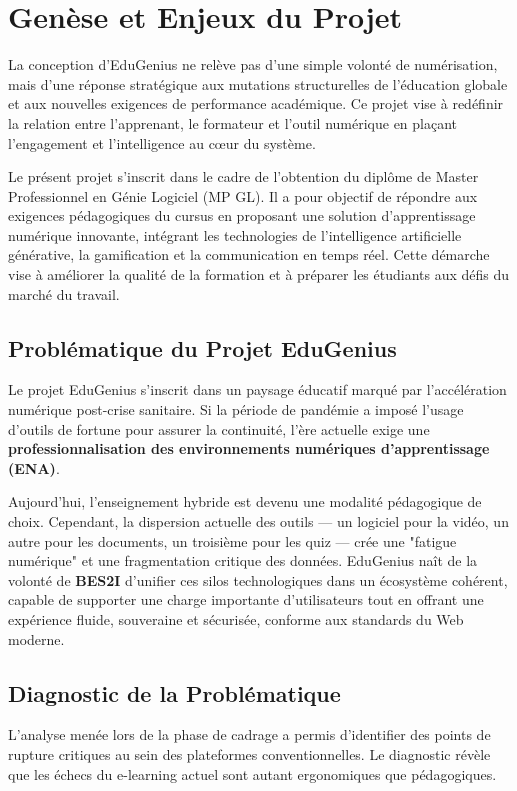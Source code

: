 \section{Genèse et Enjeux du Projet}

La conception d'EduGenius ne relève pas d'une simple volonté de numérisation, mais d'une réponse stratégique aux mutations structurelles de l'éducation globale et aux nouvelles exigences de performance académique. Ce projet vise à redéfinir la relation entre l'apprenant, le formateur et l'outil numérique en plaçant l'engagement et l'intelligence au cœur du système.

Le présent projet s'inscrit dans le cadre de l'obtention du diplôme de Master Professionnel en Génie Logiciel (MP GL). Il a pour objectif de répondre aux exigences pédagogiques du cursus en proposant une solution d'apprentissage numérique innovante, intégrant les technologies de l'intelligence artificielle générative, la gamification et la communication en temps réel. Cette démarche vise à améliorer la qualité de la formation et à préparer les étudiants aux défis du marché du travail.

\subsection{Problématique du Projet EduGenius}
Le projet EduGenius s'inscrit dans un paysage éducatif marqué par l'accélération numérique post-crise sanitaire. Si la période de pandémie a imposé l'usage d'outils de fortune pour assurer la continuité, l'ère actuelle exige une \textbf{professionnalisation des environnements numériques d'apprentissage (ENA)}.

Aujourd'hui, l'enseignement hybride est devenu une modalité pédagogique de choix. Cependant, la dispersion actuelle des outils — un logiciel pour la vidéo, un autre pour les documents, un troisième pour les quiz — crée une "fatigue numérique" et une fragmentation critique des données. EduGenius naît de la volonté de \textbf{BES2I} d'unifier ces silos technologiques dans un écosystème cohérent, capable de supporter une charge importante d'utilisateurs tout en offrant une expérience fluide, souveraine et sécurisée, conforme aux standards du Web moderne.

\subsection{Diagnostic de la Problématique}
L'analyse menée lors de la phase de cadrage a permis d'identifier des points de rupture critiques au sein des plateformes conventionnelles. Le diagnostic révèle que les échecs du e-learning actuel sont autant ergonomiques que pédagogiques.

